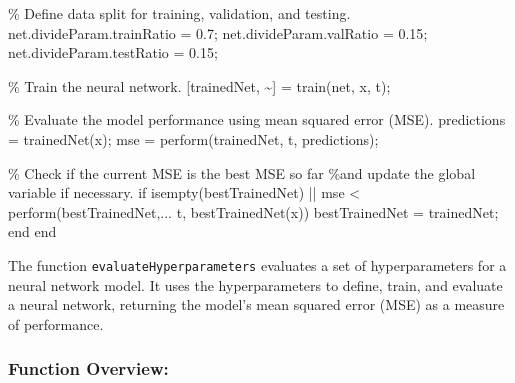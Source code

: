 \documentclass[
  super,
  review,
  3p]{elsarticle}
\newenvironment{Shaded}{\begin{snugshade}}{\end{snugshade}}
\newcommand{\CommentTok}[1]{\textcolor[rgb]{0.37,0.37,0.37}{#1}}
\newcommand{\FloatTok}[1]{\textcolor[rgb]{0.68,0.00,0.00}{#1}}
\newcommand{\KeywordTok}[1]{\textcolor[rgb]{0.00,0.23,0.31}{#1}}
\newcommand{\NormalTok}[1]{\textcolor[rgb]{0.00,0.23,0.31}{#1}}
\newcommand{\OperatorTok}[1]{\textcolor[rgb]{0.37,0.37,0.37}{#1}}
\newcommand{\VariableTok}[1]{\textcolor[rgb]{0.07,0.07,0.07}{#1}}
\begin{document}
\begin{Shaded}
\begin{Highlighting}[]
        \CommentTok{\% Define data split for training, validation, and testing.}
        \VariableTok{net}\NormalTok{.}\VariableTok{divideParam}\NormalTok{.}\VariableTok{trainRatio} \OperatorTok{=} \FloatTok{0.7}\OperatorTok{;}
        \VariableTok{net}\NormalTok{.}\VariableTok{divideParam}\NormalTok{.}\VariableTok{valRatio} \OperatorTok{=} \FloatTok{0.15}\OperatorTok{;}
        \VariableTok{net}\NormalTok{.}\VariableTok{divideParam}\NormalTok{.}\VariableTok{testRatio} \OperatorTok{=} \FloatTok{0.15}\OperatorTok{;}

        \CommentTok{\% Train the neural network.}
\NormalTok{        [}\VariableTok{trainedNet}\OperatorTok{,} \OperatorTok{\textasciitilde{}}\NormalTok{] }\OperatorTok{=} \VariableTok{train}\NormalTok{(}\VariableTok{net}\OperatorTok{,} \VariableTok{x}\OperatorTok{,} \VariableTok{t}\NormalTok{)}\OperatorTok{;}

        \CommentTok{\% Evaluate the model performance using mean squared error (MSE).}
        \VariableTok{predictions} \OperatorTok{=} \VariableTok{trainedNet}\NormalTok{(}\VariableTok{x}\NormalTok{)}\OperatorTok{;}
        \VariableTok{mse} \OperatorTok{=} \VariableTok{perform}\NormalTok{(}\VariableTok{trainedNet}\OperatorTok{,} \VariableTok{t}\OperatorTok{,} \VariableTok{predictions}\NormalTok{)}\OperatorTok{;}

        \CommentTok{\% Check if the current MSE is the best MSE so far }
        \CommentTok{\%and update the global variable if necessary.}
        \KeywordTok{if} \VariableTok{isempty}\NormalTok{(}\VariableTok{bestTrainedNet}\NormalTok{) }\OperatorTok{||} \VariableTok{mse} \OperatorTok{\textless{}} \VariableTok{perform}\NormalTok{(}\VariableTok{bestTrainedNet}\OperatorTok{,...}
         \VariableTok{t}\OperatorTok{,} \VariableTok{bestTrainedNet}\NormalTok{(}\VariableTok{x}\NormalTok{))}
            \VariableTok{bestTrainedNet} \OperatorTok{=} \VariableTok{trainedNet}\OperatorTok{;}
        \KeywordTok{end}
    \KeywordTok{end}
\end{Highlighting}
\end{Shaded}

The function \texttt{evaluateHyperparameters} evaluates a set of
hyperparameters for a neural network model. It uses the hyperparameters
to define, train, and evaluate a neural network, returning the model's
mean squared error (MSE) as a measure of performance.

\subsubsection{Function Overview:}\label{function-overview}
\end{document}
